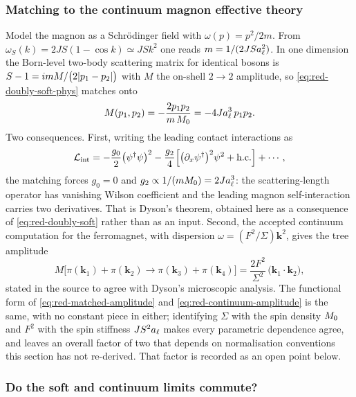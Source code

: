 \subsubsection*{Matching to the continuum magnon effective theory}

Model the magnon as a Schr\"odinger field with $\omega(p)=p^2/2m$. From
$\omega_S(k)=2JS(1-\cos k)\simeq JSk^2$ one reads $m=1/(2JSa_{\ell}^2)$. In one
dimension the Born-level two-body scattering matrix for identical bosons is
$S-1=imM/\bigl(2\lvert p_1-p_2\rvert\bigr)$ with $M$ the on-shell $2\to2$ amplitude, so
\eqref{eq:red-doubly-soft-phys} matches onto
\begin{equation}
  M(p_1,p_2)=-\frac{2p_1p_2}{m\,M_{0}}=-4Ja_{\ell}^{3}\,p_1p_2 .
  \label{eq:red-matched-amplitude}
\end{equation}
Two consequences. First, writing the leading contact interactions as
\begin{equation}
  \mathcal{L}_{\mathrm{int}}
  =-\frac{g_0}{2}\bigl(\psi^\dagger\psi\bigr)^2
   -\frac{g_2}{4}\Bigl[\bigl(\partial_x\psi^\dagger\bigr)^2\psi^2+\text{h.c.}\Bigr]
   +\dotsb,
\end{equation}
the matching forces $g_0=0$ and $g_2\propto1/(mM_{0})=2Ja_{\ell}^3$: the
scattering-length operator has vanishing Wilson coefficient and the leading
magnon self-interaction carries two derivatives. That is Dyson's theorem,
obtained here as a consequence of \eqref{eq:red-doubly-soft} rather than as an
input. Second, the accepted continuum computation for the ferromagnet, with
dispersion $\omega=(F^2/\Sigma)\bm{k}^2$, gives the tree amplitude
\begin{equation}
  M\bigl[\pi(\bm{k}_1)+\pi(\bm{k}_2)\to\pi(\bm{k}_3)+\pi(\bm{k}_4)\bigr]
  =\frac{2F^2}{\Sigma^2}\,\bigl(\bm{k}_1\cdot\bm{k}_2\bigr),
  \label{eq:red-continuum-amplitude}
\end{equation}
stated in the source to agree with Dyson's microscopic analysis. The functional
form of \eqref{eq:red-matched-amplitude} and \eqref{eq:red-continuum-amplitude}
is the same, with no constant piece in either; identifying $\Sigma$ with the
spin density $M_{0}$ and $F^2$ with the spin stiffness $JS^2a_{\ell}$ makes
every parametric dependence agree, and leaves an overall factor of two that
depends on normalisation conventions this section has not re-derived. That
factor is recorded as an open point below.

\subsubsection*{Do the soft and continuum limits commute?}

